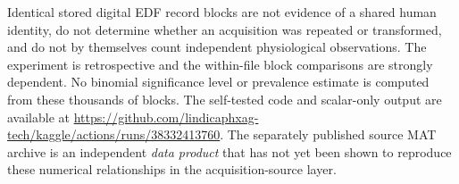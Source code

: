 Identical stored digital EDF record blocks are
not evidence of a shared human identity, do not
determine whether an acquisition was repeated or
transformed, and do not by themselves count
independent physiological observations.
The experiment is retrospective and the within-file
block comparisons are strongly dependent. No
binomial significance level or prevalence estimate
is computed from these thousands of blocks.
The self-tested code and scalar-only output are
available at
\url{https://github.com/lindicaphxag-tech/kaggle/actions/runs/38332413760}.
The separately published source MAT archive is an
independent \emph{data product} that has not yet
been shown to reproduce these numerical
relationships in the acquisition-source layer.
